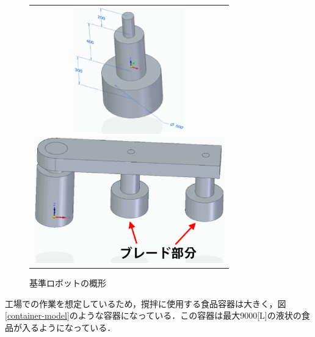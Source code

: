 \begin{figure}[htbp]
  \begin{center}
    \begin{tabular}{c}
          \begin{minipage}{0.30\hsize}
        \begin{center}
        \includegraphics[height=5.5cm]{img/eps/brade.eps}
        \caption{ミキサーのブレード}
        \label{brade}
        \end{center}
      \end{minipage}
      \begin{minipage}{0.70\hsize}
      \begin{center}
        \includegraphics[height=5.5cm]{img/eps/robot-model.eps}
        \caption{基準ロボットの概形}
        \label{robot-arm}
        \end{center}
      \end{minipage}
    \end{tabular}
  \end{center}
\end{figure}

工場での作業を想定しているため，撹拌に使用する食品容器は大きく，図\ref{container-model}のような容器になっている．この容器は最大9000{[}L{]}の液状の食品が入るようになっている．

